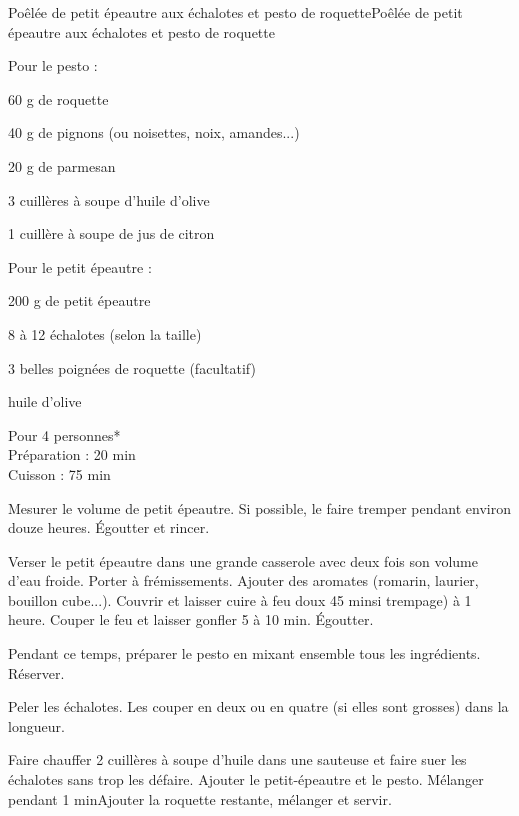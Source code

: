 \begin{recette}{Poêlée de petit épeautre aux échalotes et pesto de roquette}{Poêlée de petit épeautre aux échalotes et pesto de roquette}

\begin{ingredients}
Pour le pesto :\par
60 g de roquette\par
40 g de pignons (ou noisettes, noix, amandes...)\par
20 g de parmesan\par
3 cuillères à soupe d'huile d'olive\par
1 cuillère à soupe de jus de citron\par
Pour le petit épeautre :\par
200 g de petit épeautre\par
8 à 12 échalotes (selon la taille)\par
3 belles poignées de roquette (facultatif)\par
huile d'olive\par
\end{ingredients}

\begin{infos}
Pour 4 personnes*	\\
Préparation : 20 min\\
Cuisson : 75 min\\
\end{infos}

\begin{etapes}
\item Mesurer le volume de petit épeautre. Si possible, le faire tremper pendant environ douze heures. Égoutter et rincer.
\item Verser le petit épeautre dans une grande casserole avec deux fois son volume d'eau froide. Porter à frémissements. Ajouter des aromates (romarin, laurier, bouillon cube...). Couvrir et laisser cuire à feu doux 45 minsi trempage) à 1 heure. Couper le feu et laisser gonfler 5 à 10 min. Égoutter.
\item Pendant ce temps, préparer le pesto en mixant ensemble tous les ingrédients. Réserver.
\item Peler les échalotes. Les couper en deux ou en quatre (si elles sont grosses) dans la longueur.
\item Faire chauffer 2 cuillères à soupe d’huile dans une sauteuse et faire suer les échalotes sans trop les défaire. Ajouter le petit-épeautre et le pesto. Mélanger pendant 1 minAjouter la roquette restante, mélanger et servir.
\end{etapes}

\end{recette}